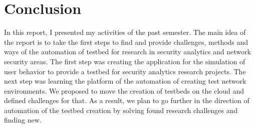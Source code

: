 
\section{Conclusion}

In this report, I presented my activities of the past semester. The main idea of the report is to take the first steps to find and provide challenges, methods and ways of the automation of testbed for research in security analytics and network security areas. The first step was creating the application for the simulation of user behavior to provide a testbed for security analytics research projects. The next step was learning the platform of the automation of creating test network environments. We proposed to move the creation of testbeds on the cloud and defined challenges for that. As a result, we plan to go further in the direction of automation of the testbed creation by solving found research challenges and finding new.